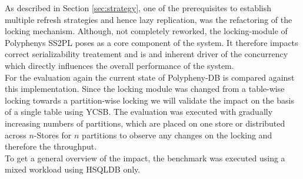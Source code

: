 As described in Section \ref{sec:strategy}, one of the prerequisites to establish multiple refresh strategies and hence lazy replication,  
was the refactoring of the locking mechanism. Although, not completely reworked, the locking-module of Polyphenys SS2PL 
poses as a core component of the system. It therefore  impacts correct serializability treatement and is and inherent driver of 
the concurrency which directly influences the overall performance of the system.\\
For the evaluation again the current state of Polypheny-DB is compared against this implementation.
Since the locking module was changed from a table-wise locking towards a partition-wise locking we will validate the impact on the basis of 
a single table using YCSB. 
The evaluation was executed with gradually increasing numbers of partitions, which are placed on one store or distributed across $n$-Stores 
for $n$ partitions to observe any changes on the locking and therefore the throughput.\\
To get a general overview of the impact, the benchmark was executed using a mixed workload using HSQLDB only.\\



